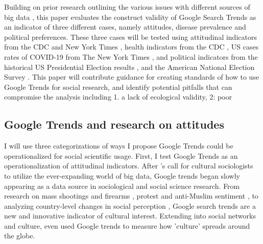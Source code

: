 Building on prior research outlining the various issues with different sources of big data
\citep{boydCriticalQuestionsBig2012,lazerIssuesConstructValidity2015},
this paper evaluates the construct validity of Google Search Trends as an indicator of three different
cases, namely attitudes, disease prevalence and political preferences.
These three cases will be tested using attitudinal indicators from the %
CDC \citeyearpar{vaches_data} and New York Times \citeyearpar{mask_data}, 
health indicators from the CDC \citeyearpar{suic_data}, 
US cases rates of COVID-19 from The New York Times \citeyearpar{covid_data},  
and political indicators from the historical US Presidential Election results \citeyearpar{pres_data}, 
and the American National Election Survey \citeyearpar{anes_data}. This paper will contribute guidance for creating standards of how to use Google
Trends for social research, and identify potential pitfalls that can compromise the 
analysis including 1. a lack of ecological validity, 2: poor 

\subsection{Google Trends and research on attitudes}

I will use three categorizations of ways I propose Google Trends could
be operationalized for social scientific usage. First, I test Google
Trends as an operationalization of attitudinal indicators. 
After \citet{bailCulturalEnvironmentMeasuring2014}'s call for
cultural sociologists to utilize the ever-expanding world of big data,
Google trends began slowly appearing as a data source in sociological and
social science research. From research on mass shootings and firearms \citep{brownsteinInternetSearchPatterns2020, semenzaInformationseekingWakeTragedy2020}, 
protest and anti-Muslim sentiment \citep{bailUsingInternetSearch2018,barrieSearchingRacismGeorge2020,grossThereFergusonEffect2017},
to analyzing country-level changes in social perception \citep{reyes_etal18},
Google search trends are a new and innovative indicator of cultural interest.
Extending into social networks and culture, \citet{bailPrestigeProximityPrejudice2019}
even used Google trends to measure how 'culture' spreads around the globe.
